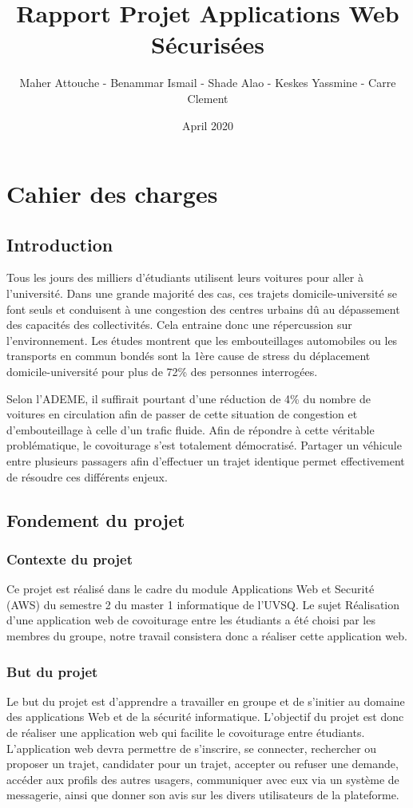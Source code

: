 \documentclass{article}
\title{Rapport Projet Applications Web Sécurisées}
\author{Maher Attouche - Benammar Ismail - Shade Alao - Keskes Yassmine - Carre Clement}
\date{April 2020}
\begin{document}
\maketitle
\section{Cahier des charges}
\subsection{Introduction}
Tous les jours des milliers d'étudiants utilisent leurs voitures pour aller à l'université. Dans une grande majorité des cas, ces trajets domicile-université se font seuls et conduisent à une congestion des centres urbains dû au dépassement des capacités des collectivités. Cela  entraine donc une répercussion sur l’environnement.  Les études montrent que les embouteillages automobiles ou les transports en commun bondés sont la 1ère cause de stress du déplacement domicile-université pour plus de 72\% des personnes interrogées.

Selon l’ADEME, il suffirait pourtant d’une réduction de 4\% du nombre de voitures en circulation afin de passer de cette situation de congestion et d’embouteillage à celle d’un trafic fluide. Afin de répondre à cette véritable problématique, le covoiturage s’est totalement démocratisé. Partager un véhicule entre plusieurs passagers afin d’effectuer un trajet identique permet effectivement de résoudre ces différents enjeux.


\subsection{Fondement du projet}
\subsubsection{Contexte du projet}
Ce projet est réalisé dans le cadre du module Applications Web et Securité (AWS) du semestre 2 du master 1 informatique de l'UVSQ. Le sujet Réalisation d'une application web de covoiturage entre les étudiants a été choisi par les membres du groupe, notre travail consistera donc a réaliser cette application web.

\subsubsection{But du projet}
Le but du projet est d'apprendre a travailler en groupe et de s'initier au domaine des applications Web et de la sécurité informatique.
L'objectif du projet est donc de réaliser une application web qui facilite le covoiturage entre étudiants. L'application web devra permettre de s’inscrire, se connecter, rechercher ou proposer un trajet, candidater pour un trajet,  accepter ou refuser une demande, accéder aux profils des autres usagers, communiquer avec eux via un système de messagerie, ainsi que donner son avis sur les divers utilisateurs de la plateforme.
\end{document}
